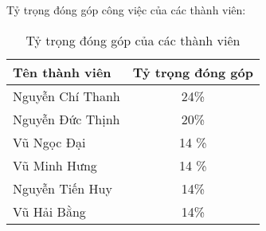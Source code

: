 Tỷ trọng đóng góp công việc của các thành viên:

\begin{table*}[h!]
    \centering
    \begin{tabular}{|l|c|}
        \hline
        Tên thành viên & Tỷ trọng đóng góp \\
        \hline
        Nguyễn Chí Thanh & 24\% \\
        \hline
        Nguyễn Đức Thịnh & 20\%  \\
        \hline
        Vũ Ngọc Đại & 14 \% \\
        \hline
        Vũ Minh Hưng & 14 \% \\
        \hline
        Nguyễn Tiến Huy & 14\% \\
        \hline
        Vũ Hải Bằng & 14\% \\
        \hline 
    \end{tabular}
    \caption*{Tỷ trọng đóng góp của các thành viên}
\end{table*}